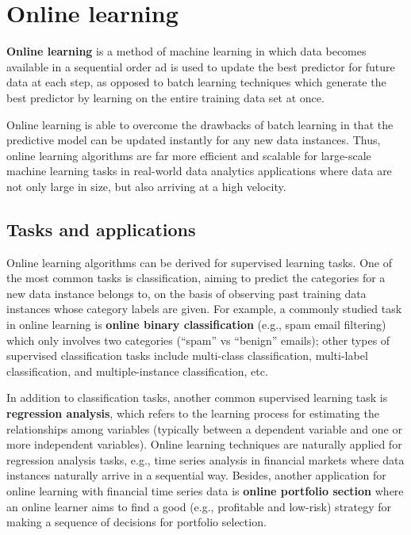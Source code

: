 \section{Online learning}
\textbf{Online learning} is a method of machine learning in which data becomes available in a sequential order ad is used to update the best predictor for future data at each step, as opposed to batch learning techniques which generate the best predictor by learning on the entire training data set at once.

Online learning is able to overcome the drawbacks of batch learning in that the predictive model can be updated instantly for any new data instances. Thus, online learning algorithms are far more efficient and scalable for large-scale machine learning tasks in real-world data analytics applications where data are not only large in size, but also arriving at a high velocity.

\subsection{Tasks and applications}

Online learning algorithms can be derived for supervised learning tasks. One of the most common tasks is classification, aiming to predict the categories for a new data instance belongs to, on the basis of observing past training data instances whose category labels are given. For example, a commonly studied task in online learning is \textbf{online binary classification} (e.g., spam email filtering) which only involves two categories (“spam” vs “benign” emails); other types of supervised classification tasks include multi-class classification, multi-label classification, and multiple-instance classification, etc.

In addition to classification tasks, another common supervised learning task is \textbf{regression analysis}, which refers to the learning process for estimating the relationships among variables (typically between a dependent variable and one or more independent variables). Online learning techniques are naturally applied for regression analysis tasks, e.g., time series analysis in financial markets where data instances naturally arrive in a sequential way. Besides, another application for online learning with financial time series data is \textbf{online portfolio section} where an online learner aims to find a good (e.g., profitable and low-risk) strategy for making a sequence of decisions for portfolio selection.

